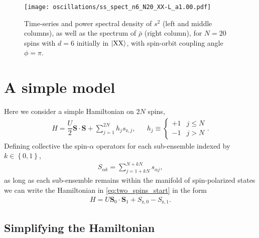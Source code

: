 \documentclass[nofootinbib,notitlepage,11pt]{revtex4-2}
\newcommand{\f}[2]{\dfrac{#1}{#2}} %
\renewcommand{\set}[1]{\left\{#1\right\}} %
\renewcommand{\v}{\bm} %
\renewcommand{\c}{\cdot} %
\newcommand{\1}{\mathds{1}}
\newcommand{\z}{\text{z}}
\newcommand{\X}{\text{X}}
\begin{document}
\begin{figure}
  \centering
  \texttt{[image: oscillations/ss\_spect\_n6\_N20\_XX-L\_a1.00.pdf]}
  \caption{Time-series and power spectral density of $s^2$ (left and middle columns), as well as the spectrum of $\bar\rho$ (right column), for $N=20$ spins with $d=6$ initially in $\ket{\X\X}$, with spin-orbit coupling angle $\phi=\pi$.}
  \label{fig:ss_spect_n6_XX-L_a1.0}
\end{figure}

\section{A simple model}

Here we consider a simple Hamiltonian on $2N$ spins,
\begin{align}
  H = \f{U}{2} \v S\c\v S + \sum_{j=1}^{2N} h_j s_{\z,j},
  &&
  h_j \equiv
  \begin{cases}
    +1 & j \le N \\
    -1 & j > N
  \end{cases}.
  \label{eq:two_spins_start}
\end{align}
Defining collective the spin-$\alpha$ operators for each sub-ensemble indexed by $k\in\set{0,1}$,
\begin{align}
  S_{\alpha k} = \sum_{j=1+kN}^{N+kN} s_{\alpha j},
\end{align}
as long as each sub-ensemble remains within the manifold of spin-polarized states we can write the Hamiltonian in \eqref{eq:two_spins_start} in the form
\begin{align}
  H = U \v S_0 \c\v S_1 + S_{\z,0} - S_{\z,1}.
\end{align}

\subsection{Simplifying the Hamiltonian}
\end{document}
